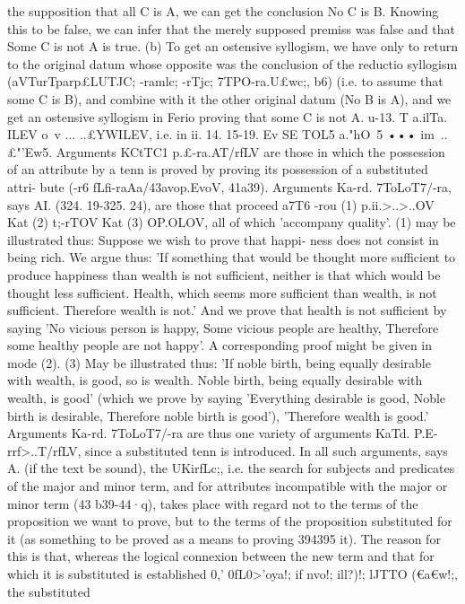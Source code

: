 {{{{{{{{{{{{{{{{{{{{{{the supposition that all C is A, we can get the conclusion No
C is B. Knowing this to be false, we can infer that the merely
supposed premiss was false and that Some C is not A is true.
(b) To get an ostensive syllogism, we have only to return to the
original datum whose opposite was the conclusion of the reductio
syllogism (aVTurTparp£LUTJC; -ramlc; -rTjc; 7TPO-ra.U£wc;, b6) (i.e. to assume
that some C is B), and combine with it the other original datum
(No B is A), and we get an ostensive syllogism in Ferio proving
that some C is not A.
u-13. T a.ilTa. ILEV o~v ... }..£YWILEV, i.e. in ii. 14.
15-19. Ev SE TOL5 a.}"hO~5 ••• im~}..£"'Ew5. Arguments KCtTC1
p.£-ra.AT/rfLV are those in which the possession of an attribute by
a tenn is proved by proving its possession of a substituted attri-
bute (-r6 fLfi-raAa/43avop.EvoV, 41a39). Arguments Ka-rd. 7ToLoT7/-ra, says
AI. (324. 19-325. 24), are those that proceed a7T6 -rou (1) p.ii.>..>..OV
Kat (2) t;-rTOV Kat (3) OP.OLOV, all of which 'accompany quality'.
(1) may be illustrated thus: Suppose we wish to prove that happi-
ness does not consist in being rich. We argue thus: 'If something
that would be thought more sufficient to produce happiness than
wealth is not sufficient, neither is that which would be thought
less sufficient. Health, which seems more sufficient than wealth,
is not sufficient. Therefore wealth is not.' And we prove that
health is not sufficient by saying 'No vicious person is happy,
Some vicious people are healthy, Therefore some healthy people
are not happy'. A corresponding proof might be given in mode
(2). (3) May be illustrated thus: 'If noble birth, being equally
desirable with wealth, is good, so is wealth. Noble birth, being
equally desirable with wealth, is good' (which we prove by saying
'Everything desirable is good, Noble birth is desirable, Therefore
noble birth is good'), 'Therefore wealth is good.'
Arguments Ka-rd. 7ToLoT7/-ra are thus one variety of arguments
KaTd. P.E-rrf>..T/rfLV, since a substituted tenn is introduced. In all
such arguments, says A. (if the text be sound), the UKirfLc;, i.e. the
search for subjects and predicates of the major and minor term,
and for attributes incompatible with the major or minor term
(43 b39-44·q), takes place with regard not to the terms of the
proposition we want to prove, but to the terms of the proposition
substituted for it (as something to be proved as a means to proving
394395
it). The reason for this is that, whereas the logical connexion
between the new term and that for which it is substituted is
established 0,' 0fL0>'oy{a!; if nvo!; ill?)!; lJTTO (}€a€w!;, the substituted
}}}}}}}}}}}}}}}}}}}
